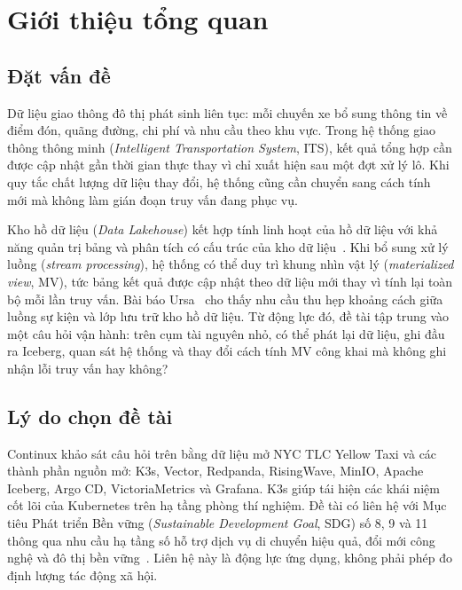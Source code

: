 \section{Giới thiệu tổng quan}\label{sec:introduction}

\subsection{Đặt vấn đề}
Dữ liệu giao thông đô thị phát sinh liên tục: mỗi chuyến xe bổ sung thông tin về điểm đón, quãng đường, chi phí và nhu cầu theo khu vực. Trong hệ thống giao thông thông minh (\emph{Intelligent Transportation System}, ITS), kết quả tổng hợp cần được cập nhật gần thời gian thực thay vì chỉ xuất hiện sau một đợt xử lý lô. Khi quy tắc chất lượng dữ liệu thay đổi, hệ thống cũng cần chuyển sang cách tính mới mà không làm gián đoạn truy vấn đang phục vụ.

Kho hồ dữ liệu (\emph{Data Lakehouse}) kết hợp tính linh hoạt của hồ dữ liệu với khả năng quản trị bảng và phân tích có cấu trúc của kho dữ liệu~\cite{armbrust2021lakehouse}. Khi bổ sung xử lý luồng (\emph{stream processing}), hệ thống có thể duy trì khung nhìn vật lý (\emph{materialized view}, MV), tức bảng kết quả được cập nhật theo dữ liệu mới thay vì tính lại toàn bộ mỗi lần truy vấn. Bài báo Ursa~\parencite{merli2025ursa} cho thấy nhu cầu thu hẹp khoảng cách giữa luồng sự kiện và lớp lưu trữ kho hồ dữ liệu. Từ động lực đó, đề tài tập trung vào một câu hỏi vận hành: trên cụm tài nguyên nhỏ, có thể phát lại dữ liệu, ghi đầu ra Iceberg, quan sát hệ thống và thay đổi cách tính MV công khai mà không ghi nhận lỗi truy vấn hay không?

\subsection{Lý do chọn đề tài}
Continux khảo sát câu hỏi trên bằng dữ liệu mở NYC TLC Yellow Taxi và các thành phần nguồn mở: K3s, Vector, Redpanda, RisingWave, MinIO, Apache Iceberg, Argo CD, VictoriaMetrics và Grafana. K3s giúp tái hiện các khái niệm cốt lõi của Kubernetes trên hạ tầng phòng thí nghiệm. Đề tài có liên hệ với Mục tiêu Phát triển Bền vững (\emph{Sustainable Development Goal}, SDG) số 8, 9 và 11 thông qua nhu cầu hạ tầng số hỗ trợ dịch vụ di chuyển hiệu quả, đổi mới công nghệ và đô thị bền vững~\parencite{sdg8,sdg9,sdg11}. Liên hệ này là động lực ứng dụng, không phải phép đo định lượng tác động xã hội.

